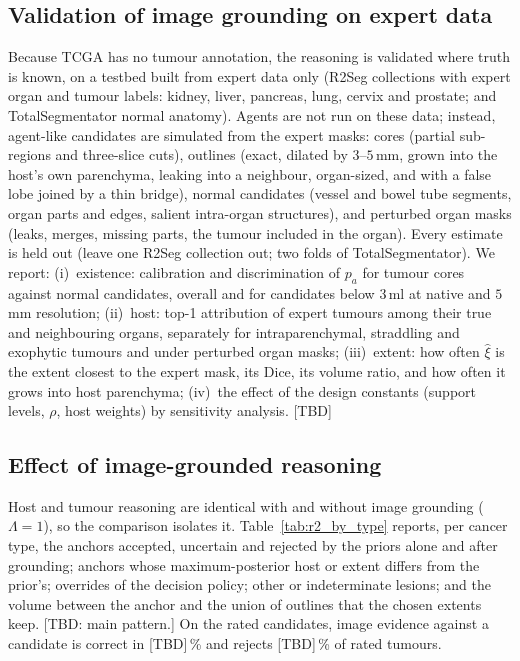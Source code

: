 \documentclass[fleqn,10pt]{olplainarticle}
\begin{document}
\subsection{Validation of image grounding on expert data}
\label{sec:results_expert}
Because TCGA has no tumour annotation, the reasoning is validated where truth is known, on a testbed built from expert
data only (R2Seg collections with expert organ and tumour labels: kidney, liver, pancreas, lung, cervix and prostate; and
TotalSegmentator normal anatomy). Agents are not run on these data; instead, agent-like candidates are simulated from the
expert masks: cores (partial sub-regions and three-slice cuts), outlines (exact, dilated by $3$--$5$\,mm, grown into the
host's own parenchyma, leaking into a neighbour, organ-sized, and with a false lobe joined by a thin bridge), normal
candidates (vessel and bowel tube segments, organ parts and edges, salient intra-organ structures), and perturbed organ
masks (leaks, merges, missing parts, the tumour included in the organ). Every estimate is held out (leave one R2Seg
collection out; two folds of TotalSegmentator). We report: (i)~existence: calibration and discrimination of $p_a$ for
tumour cores against normal candidates, overall and for candidates below $3$\,ml at native and $5$\,mm resolution;
(ii)~host: top-1 attribution of expert tumours among their true and neighbouring organs, separately for intraparenchymal,
straddling and exophytic tumours and under perturbed organ masks; (iii)~extent: how often $\hat\xi$ is the extent closest to
the expert mask, its Dice, its volume ratio, and how often it grows into host parenchyma; (iv)~the effect of the
design constants (support levels, $\rho$, host weights) by sensitivity analysis. [TBD]

\subsection{Effect of image-grounded reasoning}
\label{sec:results_r2}
Host and tumour reasoning are identical with and without image grounding ($\Lambda=1$), so the comparison isolates it.
Table~\ref{tab:r2_by_type} reports, per cancer type, the anchors accepted, uncertain and rejected by the priors alone and
after grounding; anchors whose maximum-posterior host or extent differs from the prior's; overrides of the decision policy;
other or indeterminate lesions; and the volume between the anchor and the union of outlines that the chosen extents keep. [TBD: main pattern.] On the rated candidates, image evidence against a
candidate is correct in [TBD]\,\% and rejects [TBD]\,\% of rated tumours.
\end{document}
